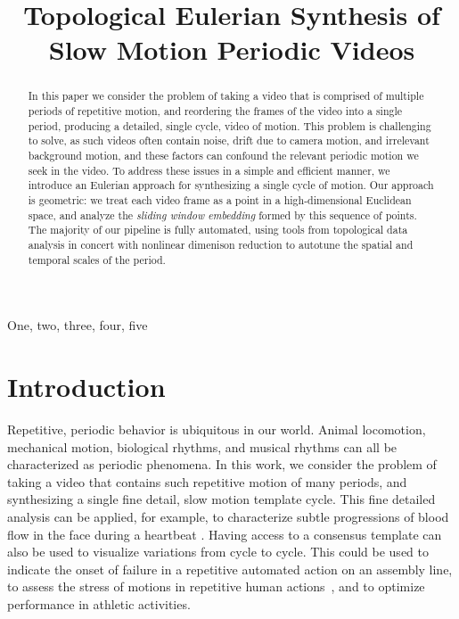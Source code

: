 \documentclass{article}
\title{Topological Eulerian Synthesis of Slow Motion Periodic Videos}
\begin{document}
%
\maketitle
%


\begin{abstract}

In this paper we consider the problem of taking a video that is comprised of multiple periods of repetitive motion, and reordering the frames of the video into a single period, producing a detailed, single cycle, video of motion.
This problem is challenging to solve, as such videos often contain noise, drift due to camera motion, and irrelevant background motion, and these factors can confound the relevant periodic motion we seek in the video.
To address these issues in a simple and efficient manner, we introduce an Eulerian approach for synthesizing a single cycle of motion.
Our approach is geometric: we treat each video frame as a point in a high-dimensional Euclidean space, and analyze the
{\em sliding window embedding} formed by this sequence of points.
The majority of our pipeline is fully automated, using tools from topological data analysis in concert with nonlinear dimenison reduction to autotune the spatial and temporal scales of the period.

\end{abstract}
%
\begin{keywords}
One, two, three, four, five
\end{keywords}
%


\section{Introduction}

Repetitive, periodic behavior is ubiquitous in our world. Animal locomotion, mechanical motion, biological rhythms, and musical rhythms can all be characterized as periodic phenomena.  In this work, we consider the problem of taking a video that contains such repetitive motion of many periods, and synthesizing a single fine detail, slow motion template cycle.  This fine detailed analysis can be applied, for example, to characterize subtle progressions of blood flow in the face during a heartbeat \cite{kumar2015distanceppg}.  Having access to a consensus template can also be used to visualize variations from cycle to cycle. This could be used to indicate the onset of failure in a repetitive automated action on an assembly line, to assess the stress of motions in repetitive human actions~\cite{greene2017visualizing}, and to optimize performance in athletic activities.
\end{document}
